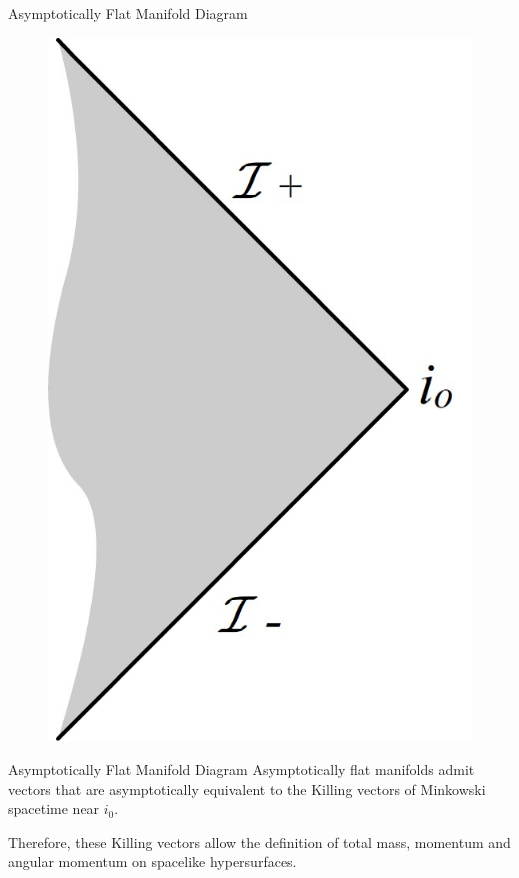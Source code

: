 \documentclass{beamer}
\begin{document}
        \begin{frame}{Asymptotically Flat Manifold Diagram}
        	\begin{center}
				\begin{figure}
				\includegraphics[scale=0.75] {fig18.jpg}
				\end{figure}
			\end{center}	
        \end{frame}
        
        \begin{frame}{Asymptotically Flat Manifold Diagram}
        	Asymptotically flat manifolds admit vectors that are asymptotically equivalent to the Killing vectors of Minkowski spacetime near $i_{0}$.\\
            \pause
            
            Therefore, these Killing vectors  allow the definition of total mass, momentum and angular momentum on spacelike hypersurfaces. 	
        \end{frame}
        
\end{document}

